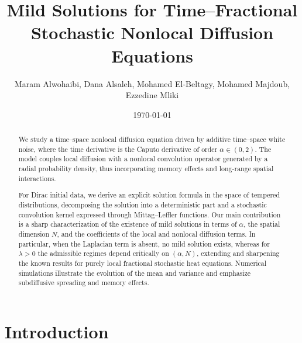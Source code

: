 \documentclass[12pt, reqno]{amsart}
\title[Stochastic PDEs]{Mild Solutions for Time--Fractional Stochastic Nonlocal Diffusion Equations}
\author[M. Alwohaibi, D. Alsaleh, M. El-Beltagy, M. Majdoub, E. Mliki]{\tiny Maram Alwohaibi, Dana Alsaleh, Mohamed El-Beltagy, Mohamed Majdoub, Ezzedine Mliki}
\begin{document}
 
\begin{abstract}
We study a time--space nonlocal diffusion equation driven by additive time--space white noise, where the time derivative is the Caputo derivative of order $\alpha\in(0,2)$. The model couples local diffusion with a nonlocal convolution operator generated by a radial probability density, thus incorporating memory effects and long-range spatial interactions.

For Dirac initial data, we derive an explicit solution formula in the space of tempered distributions, decomposing the solution into a deterministic part and a stochastic convolution kernel expressed through Mittag--Leffler functions. Our main contribution is a sharp characterization of the existence of mild solutions in terms of $\alpha$, the spatial dimension $N$, and the coefficients of the local and nonlocal diffusion terms. In particular, when the Laplacian term is absent, no mild solution exists, whereas for $\lambda>0$ the admissible regimes depend critically on $(\alpha,N)$, extending and sharpening the known results for purely local fractional stochastic heat equations. Numerical simulations illustrate the evolution of the mean and variance and emphasize subdiffusive spreading and memory effects.
\end{abstract}









\date{\today}


\maketitle




\section{Introduction}
\label{S1}
\end{document}

